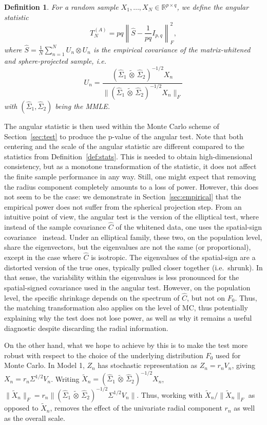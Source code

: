 \documentclass[12pt]{article}
\newcommand{\R}{\mathbb{R}}
\newcommand{\ot}{\,\tilde\otimes\,}
\newcommand{\mmle}{\widehat \Sigma_1 \ot \widehat \Sigma_2}
\newtheorem{definition}{Definition}
\begin{document}
\begin{definition}\label{def:angular_test}
    For a random sample $X_1,\ldots,X_N \in \R^{p \times q}$, we define the angular statistic
    \[
    T_N^{(A)} = pq \left\| \widehat{S} - \frac{1}{pq} I_{p,q}\right\|_F^2,
    \]
    where $\widehat{S} = \frac{1}{N}\sum_{n=1}^N U_n \otimes U_n$ is the empirical covariance of the matrix-whitened and sphere-projected sample, i.e.
    \[
    U_n = \frac{(\mmle)^{-1/2} X_n}{\| (\mmle)^{-1/2} X_n \|_F}
    \]
    with $(\widehat \Sigma_1,\widehat \Sigma_2)$ being the MMLE.
\end{definition}

The angular statistic is then used within the Monte Carlo scheme of Section~\ref{sec:test} to produce the p-value of the angular test. Note that both centering and the scale of the angular statistic are different compared to the statistics from Definition~\ref{def:stats}. This is needed to obtain high-dimensional consistency, but as a monotone transformation of the statistic, it does not affect the finite sample performance in any way. Still, one might expect that removing the radius component completely amounts to a loss of power. However, this does not seem to be the case: we demonstrate in Section~\ref{sec:empirical} that the empirical power does not suffer from the spherical projection step. From an intuitive point of view, the angular test is the version of the elliptical test, where instead of the sample covariance $\hat{C}$ of the whitened data, one uses the spatial-sign covariance~\citep{DURRE201680} instead. Under an elliptical family, these two, on the population level, share the eigenvectors, but the eigenvalues are not the same (or proportional), except in the case where $\hat{C}$ is isotropic. The eigenvalues of the spatial-sign 
are a distorted version of the true ones, typically pulled closer together (i.e.~shrunk). In that sense, the variability within the eigenvalues is less pronounced for the spatial-signed covariance used in the angular test. 
However, on the population level, the specific shrinkage depends on the spectrum of $\hat{C}$, but not on $F_0$. Thus, the matching transformation also applies on the level of MC, thus potentially explaining why the test does not lose power, as well as why it remains a useful diagnostic despite discarding the radial information.

On the other hand, what we hope to achieve by this is to make the test more robust with respect to the choice of the underlying distribution $F_0$ used for Monte Carlo. In Model 1, $Z_n$ has stochastic representation as $Z_n=r_n V_n$, giving $X_n=r_n\Sigma^{1/2}V_n$. Writing $\tilde X_n=(\hat\Sigma_1\ot\hat\Sigma_2)^{-1/2}X_n$, $\|\tilde X_n\|_F=r_n\|(\hat\Sigma_1\ot\hat\Sigma_2)^{-1/2}\Sigma^{1/2}V_n\|$. Thus, working with $\tilde X_n/\|\tilde X_n\|_F$ as opposed to $\tilde X_n$, removes the effect of the univariate radial component $r_n$ as well as the overall scale.
\end{document}
